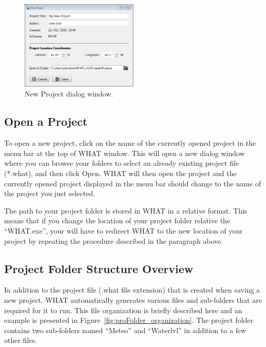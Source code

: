 \documentclass[12pt, letterpaper, fleqn]{report}
\begin{document}
\begin{figure}[h!]
\centering
\includegraphics[width=0.5\textwidth]{WHAT_Screenshot_newproject}
\caption[New Project dialog window.]{New Project dialog window.}
\label{fig:new_proj_win}
\end{figure}

\FloatBarrier

\subsection{Open a Project}

To open a new project, click on the name of the currently opened project in the menu bar at the top of WHAT window. This will open a new dialog window where you can browse your folders to select an already existing project file (*.what), and then click Open. WHAT will then open the project and the currently opened project displayed in the menu bar should change to the name of the project you just selected.

The path to your project folder is stored in WHAT in a relative format. This means that if you change the location of your project folder relative the ``WHAT.exe'', your will have to redirect WHAT to the new location of your project by repeating the procedure described in the paragraph above.

\subsection{Project Folder Structure Overview}

In addition to the project file (.what file extension) that is created when saving a new project, WHAT automatically generates various files and sub-folders that are required for it to run. This file organization is briefly described here and an example is presented in Figure~\ref{fig:proFolder_organization}. The project folder contains two sub-folders named ``Meteo'' and ``Waterlvl'' in addition to a few other files.
\end{document}
